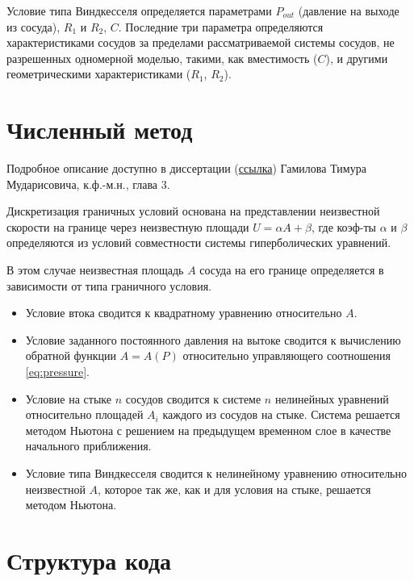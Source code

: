 \documentclass[12pt]{article}
\begin{document}
Условие типа Виндкесселя определяется параметрами $P_{out}$ (давление на выходе из сосуда), $R_1$ и $R_2$, $C$. Последние три параметра определяются характеристиками сосудов за пределами рассматриваемой системы сосудов, не разрешенных одномерной моделью, такими, как вместимость ($C$), и другими геометрическими характеристиками ($R_1$, $R_2$).

\section{Численный метод}\label{sec:numerical}

Подробное описание доступно в диссертации (\href{https://www.inm.ras.ru/wp-content/uploads/dis-sovet/disser/\%D0\%93\%D0\%B0\%D0\%BC\%D0\%B8\%D0\%BB\%D0\%BE\%D0\%B2_\%D0\%94\%D0\%B8\%D1\%81\%D1\%81\%D0\%B5\%D1\%80\%D1\%82\%D0\%B0\%D1\%86\%D0\%B8\%D1\%8F.pdf}{ссылка})
 Гамилова Тимура Мударисовича, к.ф.-м.н., глава 3.

Дискретизация граничных условий основана на представлении неизвестной скорости на границе через неизвестную площади $U = \alpha A + \beta$, где коэф-ты $\alpha$ и $\beta$ определяются из условий совместности системы гиперболических уравнений. 

В этом случае неизвестная площадь $A$ сосуда на его границе определяется в зависимости от типа граничного условия.

\begin{itemize}
	\item Условие втока сводится к квадратному уравнению относительно $A$.
	\item Условие заданного постоянного давления на вытоке сводится к вычислению обратной функции $A = A(P)$ относительно управляющего соотношения \eqref{eq:pressure}.
	\item Условие на стыке $n$ сосудов сводится к системе $n$ нелинейных уравнений относительно площадей $A_i$ каждого из сосудов на стыке. Система решается методом Ньютона с решением на предыдущем временном слое в качестве начального приближения.
	\item Условие типа Виндкесселя сводится к нелинейному уравнению относительно неизвестной $A$, которое так же, как и для условия на стыке, решается методом Ньютона.
\end{itemize}

\section{Структура кода}\label{sec:program}
\end{document}
